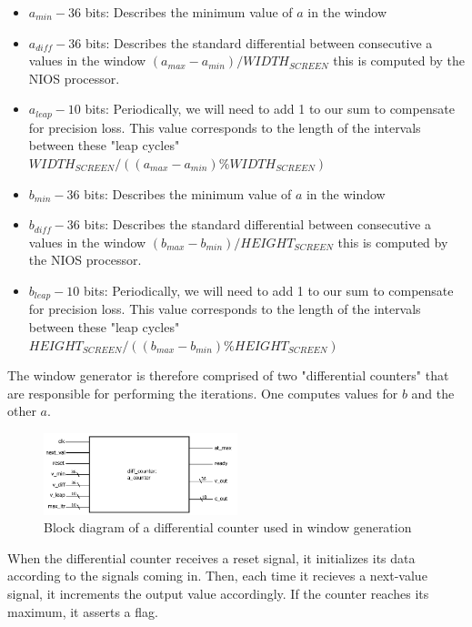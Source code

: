 \documentclass{article}
\begin{document}
\begin{itemize}
\item $a_{min} - 36$ bits: Describes the minimum value of $a$ in the window
\item $a_{diff} - 36$ bits: Describes the standard differential between consecutive a values in the window $(a_{max} - a_{min})/WIDTH_{SCREEN}$ this is computed by the NIOS processor.
\item $a_{leap} - 10$ bits: Periodically, we will need to add 1 to our sum to compensate for precision loss. This value
corresponds to the length of the intervals between these "leap cycles" $WIDTH_{SCREEN}/((a_{max} - a_{min})\%WIDTH_{SCREEN})$
\item $b_{min} - 36$ bits: Describes the minimum value of $a$ in the window
\item $b_{diff} - 36$ bits: Describes the standard differential between consecutive a values in the window $(b_{max} - b_{min})/HEIGHT_{SCREEN}$ this is computed by the NIOS processor.
\item $b_{leap} - 10$ bits: Periodically, we will need to add 1 to our sum to compensate for precision loss. This value
corresponds to the length of the intervals between these "leap cycles" $HEIGHT_{SCREEN}/((b_{max} - b_{min})\%HEIGHT_{SCREEN})$
\end{itemize}

The window generator is therefore comprised of two "differential counters" that are responsible for performing the 
iterations. One computes values for $b$ and the other $a$. 

\begin{figure}
  \centering
    \includegraphics[width=160pt]{block_diagrams/acounter.pdf}
  \caption{Block diagram of a differential counter used in window generation}
\end{figure}

When the differential counter receives a reset signal, it initializes its data according to the signals coming in.
Then, each time it recieves a next-value signal, it increments the output value accordingly. If the counter reaches
its maximum, it asserts a flag.
\end{document}

